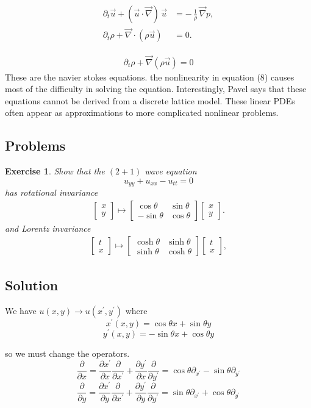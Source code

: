 \documentclass[11pt,a4paper]{article}
\newtheorem*{exercise}{Exercise}
\newcommand{\solution}[1]{
	\subsection*{Solution}
	#1
}
\newcommand{\problems}[1]{
	\subsection*{Problems}
	#1
}
\begin{document}
\begin{align*}
	\partial_t \vec{u} + (\vec{u}\!\cdot\!\vec{\nabla})\,\vec{u}
	&= -\,\frac{1}{\rho}\,\vec{\nabla} p, \\[6pt]
	\partial_t \rho + \vec{\nabla}\!\cdot(\rho \vec{u})
	&= 0.
\end{align*}


\begin{align*}
	\partial_{t}\rho+\vec{\nabla}(\rho\vec{u})=0
\end{align*}
These are the navier stokes equations. the nonlinearity in equation (8) causes most of the difficulty in solving the equation. Interestingly, Pavel says that these equations cannot be derived from a discrete lattice model. These linear PDEs often appear as approximations to more complicated nonlinear problems.
\problems{
\begin{exercise}
Show that the $(2+1)$ wave equation 
$$
u_{yy} +u_{xx} - u_{tt} = 0
$$
has rotational invariance
\begin{align*}
	\begin{bmatrix}
		x \\[6pt]
		y
	\end{bmatrix}
	\mapsto
	\begin{bmatrix}
		\cos\theta & \sin\theta \\[6pt]
		-\sin\theta & \cos\theta
	\end{bmatrix}
	\begin{bmatrix}
		x \\[6pt]
		y
	\end{bmatrix}.
\end{align*}
and Lorentz invariance
\begin{align*}
	\begin{bmatrix}
		t \\[6pt]
		x
	\end{bmatrix}
	\mapsto
	\begin{bmatrix}
		\cosh\theta & \sinh\theta \\[6pt]
		\sinh\theta & \cosh\theta
	\end{bmatrix}
	\begin{bmatrix}
		t \\[6pt]
		x
	\end{bmatrix},
\end{align*}
 \end{exercise}
 \solution{
 We have $u(x,y)\to u(x^{\prime},y^{\prime})$
 where
 $$
 x^{\prime}(x,y) = \cos\theta x + \sin\theta y
 $$
$$
y^{\prime}(x,y) = -\sin\theta x +\cos\theta y
$$
 }
so we must change the operators.
$$
\frac{\partial}{\partial x} = \frac{\partial x^{\prime}}{\partial x}\frac{\partial}{\partial x^{\prime}} + \frac{\partial y^{\prime}}{\partial x}\frac{\partial}{\partial y^{\prime}} = \cos\theta\partial_{x^{\prime}} -\sin\theta\partial_{y^{\prime}}
$$
$$
\frac{\partial}{\partial y} = \frac{\partial x^{\prime}}{\partial y}\frac{\partial}{\partial x^{\prime}} + \frac{\partial y^{\prime}}{\partial y}\frac{\partial}{\partial y^{\prime}} = \sin\theta\partial_{x^{\prime}}+\cos\theta\partial_{y^{\prime}}
$$
}
\end{document}
